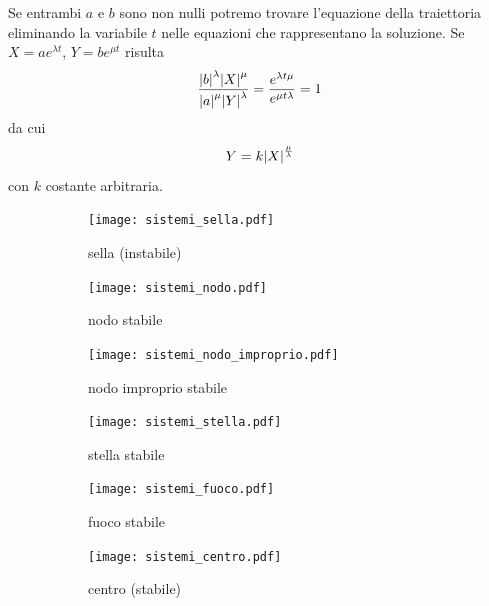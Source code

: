 Se entrambi $a$ e $b$ sono non nulli potremo trovare
l'equazione della traiettoria eliminando la variabile
$t$ nelle
equazioni che rappresentano la soluzione.
Se $X=a e^{\lambda t}$, $Y=b e^{\mu t}$ risulta
\[
  \frac{{\left|b\right|}^\lambda {\left|X\right|}^\mu}{{\left|a\right|}^\mu {\left|Y\right|}^\lambda}
  = \frac{e^{\lambda t \mu}}{e^{\mu t \lambda}} = 1
\]
da cui
\[
 Y = k {\left|X\right|}^{\frac \mu \lambda}
\]
con $k$ costante arbitraria.

\newsavebox{\qrsistemisella}
\newsavebox{\qrsisteminodo}
\newsavebox{\qrsisteminodoimproprio}
\newsavebox{\qrsistemistella}
\newsavebox{\qrsistemifuoco}
\newsavebox{\qrsistemicentro}
\begin{figure}
\centering
 \begin{subfigure}{5cm}
  \texttt{[image: sistemi\_sella.pdf]}
  \caption[1a]{sella (instabile)}
 \end{subfigure}
 \begin{subfigure}{5cm}
  \texttt{[image: sistemi\_nodo.pdf]}
  \caption{nodo stabile}
 \end{subfigure}
 \begin{subfigure}{5cm}
 \centering\texttt{[image: sistemi\_nodo\_improprio.pdf]}
  \caption{nodo improprio stabile}
 \end{subfigure}
 \begin{subfigure}{5cm}
  \centering\texttt{[image: sistemi\_stella.pdf]}
  \caption{stella stabile}
 \end{subfigure}
 \begin{subfigure}{5cm}
  \centering\texttt{[image: sistemi\_fuoco.pdf]}
  \caption{fuoco stabile}
 \end{subfigure}
 \begin{subfigure}{5cm}
  \centering\texttt{[image: sistemi\_centro.pdf]}
  \caption{centro (stabile)}
 \end{subfigure}
 \caption{\\%
 \usebox{\qrsistemisella} \usebox{\qrsisteminodo}\\
 \usebox{\qrsisteminodoimproprio} \usebox{\qrsistemistella}\\
 \usebox{\qrsistemifuoco} \usebox{\qrsistemicentro}
 }
\end{figure}


